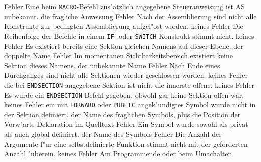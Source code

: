 \documentclass[12pt,a4paper,twoside]{report}
\newcommand{\tty}[1]{{\tt #1}}
\begin{document}
\begin{description}
               {Fehler}
               {Eine beim \tty{MACRO}-Befehl zus"atzlich angegebene
                Steueranweisung ist AS unbekannt.}
               {die fragliche Anweisung}
               {Fehler}
               {Nach der Assemblierung sind nicht alle
                Konstrukte zur bedingten Assemblierung aufgel"ost
                worden.}
               {keines}
               {Fehler}
               {Die Reihenfolge der Befehle in einem \tty{IF}-
	        oder \tty{SWITCH}-Konstrukt stimmt nicht.}
               {keines}
               {Fehler}
               {Es existiert bereits eine Sektion gleichen
                Namens auf dieser Ebene.}
               {der doppelte Name}
               {Fehler}
               {Im momentanen Sichtbarkeitsbereich existiert
                keine Sektion dieses Namens.}
               {der unbekannte Name}
               {Fehler}
               {Nach Ende eines Durchganges sind nicht alle
                Sektionen wieder geschlossen worden.}
               {keines}
               {Fehler}
               {die bei \tty{ENDSECTION} angegebene Sektion
	        ist nicht die innerste offene.}
               {keines}
               {Fehler}
               {Es wurde ein \tty{ENDSECTION}-Befehl gegeben, obwohl
                gar keine Sektion offen war.}
               {keines}
               {Fehler}
               {ein mit \tty{FORWARD} oder \tty{PUBLIC}
	        angek"undigtes Symbol wurde nicht in der Sektion definiert.}
               {der Name des fraglichen Symbols, plus die
                Position der Vorw"arts-Deklaration im Quelltext}
               {Fehler}
               {Ein Symbol wurde sowohl als privat als auch
                global definiert.}
               {der Name des Symbols}
               {Fehler}
               {Die Anzahl der Argumente f"ur eine
                selbstdefinierte Funktion stimmt nicht mit der geforderten
                Anzahl "uberein.}
               {keines}
               {Fehler}
               {Am Programmende oder beim Umachalten
}
\end{description}
\end{document}
